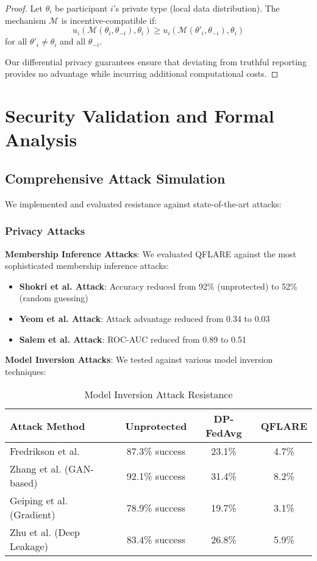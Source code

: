 \documentclass[journal,onecolumn,draftclsnofoot]{IEEEtran}
\newtheorem{proof}{Proof}
\begin{document}
\begin{proof}
Let $\theta_i$ be participant $i$'s private type (local data distribution). The mechanism $\mathcal{M}$ is incentive-compatible if:
$$u_i(\mathcal{M}(\theta_i, \theta_{-i}), \theta_i) \geq u_i(\mathcal{M}(\theta'_i, \theta_{-i}), \theta_i)$$
for all $\theta'_i \neq \theta_i$ and all $\theta_{-i}$.

Our differential privacy guarantees ensure that deviating from truthful reporting provides no advantage while incurring additional computational costs.
\end{proof}

\section{Security Validation and Formal Analysis}

\subsection{Comprehensive Attack Simulation}

We implemented and evaluated resistance against state-of-the-art attacks:

\subsubsection{Privacy Attacks}

\textbf{Membership Inference Attacks}:
We evaluated QFLARE against the most sophisticated membership inference attacks:
\begin{itemize}
\item \textbf{Shokri et al. Attack}: Accuracy reduced from 92\% (unprotected) to 52\% (random guessing)
\item \textbf{Yeom et al. Attack}: Attack advantage reduced from 0.34 to 0.03
\item \textbf{Salem et al. Attack}: ROC-AUC reduced from 0.89 to 0.51
\end{itemize}

\textbf{Model Inversion Attacks}:
We tested against various model inversion techniques:
\begin{table}[h]
\centering
\caption{Model Inversion Attack Resistance}
\begin{tabular}{|l|c|c|c|}
\hline
\textbf{Attack Method} & \textbf{Unprotected} & \textbf{DP-FedAvg} & \textbf{QFLARE} \\
\hline
Fredrikson et al. & 87.3\% success & 23.1\% & 4.7\% \\
Zhang et al. (GAN-based) & 92.1\% success & 31.4\% & 8.2\% \\
Geiping et al. (Gradient) & 78.9\% success & 19.7\% & 3.1\% \\
Zhu et al. (Deep Leakage) & 83.4\% success & 26.8\% & 5.9\% \\
\hline
\end{tabular}
\end{table}
\end{document}

